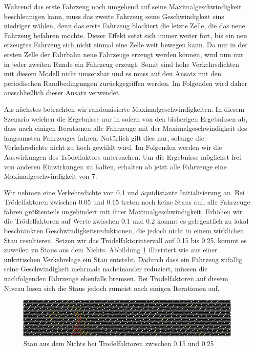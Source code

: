 \documentclass[10pt, a4paper]{article}
\begin{document}
Während das erste Fahrzeug noch umgehend auf seine Maximalgeschwindigkeit beschleunigen kann, muss das zweite Fahrzeug seine Geschwindigkeit eins niedriger wählen, denn das erste Fahrzeug blockiert die letzte Zelle, die das neue Fahrzeug befahren möchte. Dieser Effekt setzt sich immer weiter fort, bis ein neu erzeugtes Fahrzeug sich nicht einmal eine Zelle weit bewegen kann. Da nur in der ersten Zelle der Fahrbahn neue Fahrzeuge erzeugt werden können, wird nun nur in jeder zweiten Runde ein Fahrzeug erzeugt. Somit sind hohe Verkehrsdichten mit diesem Modell nicht umsetzbar und es muss auf den Ansatz mit den periodischen Randbedingungen zurückgegriffen werden. Im Folgenden wird daher ausschließlich dieser Ansatz verwendet.

Als nächstes betrachten wir randomisierte Maximalgeschwindigkeiten. In diesem Szenario weichen die Ergebnisse nur in sofern von den bisherigen Ergebnissen ab, dass nach einigen Iterationen alle Fahrzeuge mit der Maximalgeschwindigkeit des langsamsten Fahrzeuges fahren. Natürlich gilt dies nur, solange die Verkehrsdichte nicht zu hoch gewählt wird. Im Folgenden werden wir die Auswirkungen des Trödelfaktors untersuchen. Um die Ergebnisse möglichst frei von anderen Einwirkungen zu halten, erhalten ab jetzt alle Fahrzeuge eine Maximalgeschwindigkeit von 7.

Wir nehmen eine Verkehrsdichte von 0.1 und äquidistante Initialisierung an. Bei Trödelfaktoren zwischen 0.05 und 0.15 treten noch keine Staus auf, alle Fahrzeuge fahren größtenteils ungehindert mit ihrer Maximalgeschwindigkeit. Erhöhen wir die Trödelfaktoren auf Werte zwischen 0.1 und 0.2 kommt es gelegentlich zu lokal beschränkten Geschwindigkeitsreduktionen, die jedoch nicht in einem wirklichen Stau resultieren. Setzen wir das Trödelfaktorintervall auf 0.15 bis 0.25, kommt es zuweilen zu Staus aus dem Nichts. Abbildung \ref{fig:ergStauAusDemNichtsP0_2} illustriert wie aus einer unkritischen Verkehrslage ein Stau entsteht. Dadurch dass ein Fahrzeug zufällig seine Geschwindigkeit mehrmals nacheinander reduziert, müssen die nachfolgenden Fahrzeuge ebenfalls bremsen. Bei Trödelfaktoren auf diesem Niveau lösen sich die Staus jedoch zumeist nach einigen Iterationen auf.

\begin{figure}[h!]
	\centering
	\includegraphics[width=\textwidth]{img/erg_einspurig_stau_aus_dem_nichts_dichte_0_1_p_0_15_bis_0_25}
	\caption{Stau aus dem Nichts bei Trödelfaktoren zwischen 0.15 und 0.25}
	\label{fig:ergStauAusDemNichtsP0_2}
\end{figure}
\end{document}
